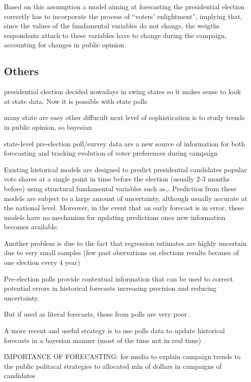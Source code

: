 \documentclass[
  12pt]{article}
\begin{document}
Based on this assumption a model aiming at forecasting the presidential
election correctly has to incorporate the process of ``voters'
enlightment'', implying that, since the values of the fundamental
variables do not change, the weigths respondents attach to these
variables have to change during the campaign, accounting for changes in
public opinion.

\hypertarget{others}{%
\subsection{Others}\label{others}}

presidential election decided nowadays in swing states so it makes sense
to look at state data. Now it is possible with state polls

many state are easy other diffucult next level of sophistication is to
study trends in public opinion, so bayesian

state-level pre-election poll/survey data are a new source of
information for both forecasting and tracking evolution of voter
preferences during campaign

Existing historical models are designed to predict presidential
candidates popular vote shares at a single point in time before the
election (usually 2-3 months before) using structural fundamental
variables such as\ldots{} Prediction from these models are subject to a
large amount of uncertainty, although usually accurate at the national
level. Moreover, in the event that an early forecast is in error, these
models have no mechanism for updating predictions once new information
becomes available.

Another problem is due to the fact that regression estimates are highly
uncertain due to very small samples (few past obervations on elections
results becaues of one election every 4 year)

Pre-election polls provide contextual information that can be used to
correct potential errors in historical forecasts increasing precision
and reducing uncertainty.

But if used as literal forecasts, those from polls are very poor.

A more recent and useful strategy is to use polls data to update
historical forecasts in a bayesian manner (most of the time not in real
time)

IMPORTANCE OF FORECASTING: for media to explain campaign trends to the
public politacal strategies to allocated mln of dollars in campaigns of
candidates
\end{document}
